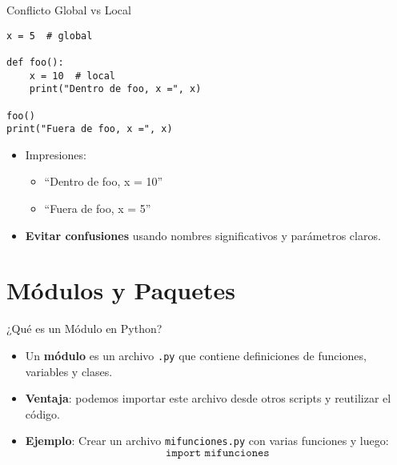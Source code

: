 \documentclass[10pt]{beamer}
\begin{document}
\begin{frame}[fragile]{Conflicto Global vs Local}
\begin{verbatim}
x = 5  # global

def foo():
    x = 10  # local
    print("Dentro de foo, x =", x)

foo()
print("Fuera de foo, x =", x)
\end{verbatim}
\begin{itemize}
  \item Impresiones:
    \begin{itemize}
      \item “Dentro de foo, x = 10”
      \item “Fuera de foo, x = 5”
    \end{itemize}
  \item \textbf{Evitar confusiones} usando nombres significativos y parámetros claros.
\end{itemize}
\end{frame}

\section{Módulos y Paquetes}

\begin{frame}{¿Qué es un Módulo en Python?}
  \begin{itemize}
    \item Un \textbf{módulo} es un archivo \texttt{.py} que contiene definiciones de funciones, variables y clases.
    \item \textbf{Ventaja}: podemos importar este archivo desde otros scripts y reutilizar el código.
    \item \textbf{Ejemplo}: Crear un archivo \texttt{mifunciones.py} con varias funciones y luego:
    \[
      \texttt{import mifunciones}
    \]
  \end{itemize}
\end{frame}
\end{document}
